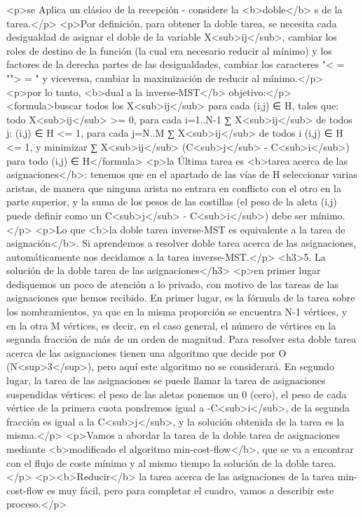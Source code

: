 <p>se Aplica un clásico de la recepción - considere la <b>doble</b> s de la tarea.</p>
<p>Por definición, para obtener la doble tarea, se necesita cada desigualdad de asignar el doble de la variable X<sub>ij</sub>, cambiar los roles de destino de la función (la cual era necesario reducir al mínimo) y los factores de la derecha partes de las desigualdades, cambiar los caracteres "< = ""> = " y viceversa, cambiar la maximización de reducir al mínimo.</p>
<p>por lo tanto, <b>dual a la inverse-MST</b> objetivo:</p>
<formula>buscar todos los X<sub>ij</sub> para cada (i,j) ∈ H, tales que:
todo X<sub>ij</sub> >= 0,
para cada i=1..N-1 ∑ X<sub>ij</sub> de todos j: (i,j) ∈ H <= 1,
para cada j=N..M ∑ X<sub>ij</sub> de todos i (i,j) ∈ H <= 1,
y minimizar ∑ X<sub>ij</sub> (C<sub>j</sub> - C<sub>i</sub>) para todo (i,j) ∈ H</formula>
<p>la Última tarea es <b>tarea acerca de las asignaciones</b>: tenemos que en el apartado de las vías de H seleccionar varias aristas, de manera que ninguna arista no entrara en conflicto con el otro en la parte superior, y la suma de los pesos de las costillas (el peso de la aleta (i,j) puede definir como un C<sub>j</sub> - C<sub>i</sub>) debe ser mínimo.</p>
<p>Lo que <b>la doble tarea inverse-MST es equivalente a la tarea de asignación</b>. Si aprendemos a resolver doble tarea acerca de las asignaciones, automáticamente nos decidamos a la tarea inverse-MST.</p>
<h3>5. La solución de la doble tarea de las asignaciones</h3>
<p>en primer lugar dediquemos un poco de atención a lo privado, con motivo de las tareas de las asignaciones que hemos recibido. En primer lugar, es la fórmula de la tarea sobre los nombramientos, ya que en la misma proporción se encuentra N-1 vértices, y en la otra M vértices, es decir, en el caso general, el número de vértices en la segunda fracción de más de un orden de magnitud. Para resolver esta doble tarea acerca de las asignaciones tienen una algoritmo que decide por O (N<sup>3</sup>), pero aquí este algoritmo no se considerará. En segundo lugar, la tarea de las asignaciones se puede llamar la tarea de asignaciones suspendidas vértices: el peso de las aletas ponemos un 0 (cero), el peso de cada vértice de la primera cuota pondremos igual a -C<sub>i</sub>, de la segunda fracción es igual a la C<sub>j</sub>, y la solución obtenida de la tarea es la misma.</p>
<p>Vamos a abordar la tarea de la doble tarea de asignaciones mediante <b>modificado el algoritmo min-cost-flow</b>, que se va a encontrar con el flujo de coste mínimo y al mismo tiempo la solución de la doble tarea.</p>
<p><b>Reducir</b> la tarea acerca de las asignaciones de la tarea min-cost-flow es muy fácil, pero para completar el cuadro, vamos a describir este proceso.</p>
